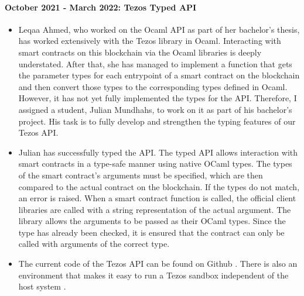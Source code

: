 \documentclass[a4paper,11pt]{article}
\begin{document}
\paragraph{October 2021 - March 2022:  Tezos Typed API} 
\begin{itemize}
\item Leqaa Ahmed, who worked on the Ocaml API as part of her bachelor's thesis, has worked extensively with the Tezos library in Ocaml. Interacting with smart contracts on this blockchain via the Ocaml libraries is deeply understated. After that, she has managed to implement a function that gets the parameter types for each entrypoint of a smart contract on the blockchain and then convert those types to the corresponding types defined in Ocaml. However, it has not yet fully implemented the types for the API. Therefore, I assigned a student, Julian Mundhahs, to work on it as part of his bachelor's project. His task is to fully develop and strengthen the typing features of our Tezos API.
\item Julian has successfully typed the API. The typed API allows interaction with smart contracts in a type-safe manner using native OCaml types. The types of the smart contract's arguments must be specified, which are then compared to the actual contract on the blockchain. If the types do not match, an error is raised. When a smart contract function is called, the official client libraries are called with a string representation of the actual argument. The library allows the arguments to be passed as their OCaml types. Since the type has already been checked, it is ensured that the contract can only be called with arguments of the correct type. 
\item  The current code of the Tezos API can be found on Github \cite{tezos-api-update}. There is also an environment that makes it easy to run a Tezos sandbox independent of the host system \cite{tezos-api-devenv}.
\end{itemize}
 
\end{document}
